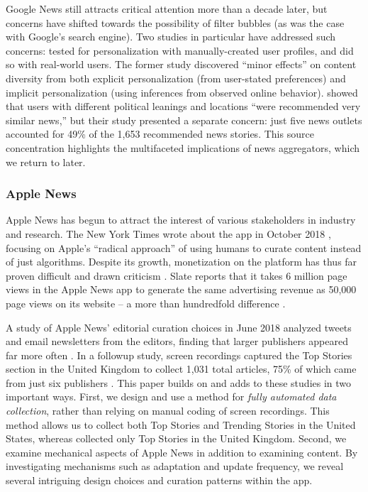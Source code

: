 Google News still attracts critical attention more than a decade later, but concerns have shifted towards the possibility of filter bubbles (as was the case with Google's search engine). Two studies in particular have addressed such concerns: \citet{Haim2018} tested for personalization with manually-created user profiles, and \citet{Nechushtai2019} did so with real-world users. The former study discovered ``minor effects'' on content diversity from both explicit personalization (from user-stated preferences) and implicit personalization (using inferences from observed online behavior). \citet{Nechushtai2019} showed that users with different political leanings and locations ``were recommended very similar news,'' but their study presented a separate concern: just five news outlets accounted for 49\% of the 1,653 recommended news stories. This source concentration highlights the multifaceted implications of news aggregators, which we return to later.


\subsubsection{Apple News}
Apple News has begun to attract the interest of various stakeholders in industry and research. The New York Times wrote about the app in October 2018 \citep{Nicas2018}, focusing on Apple's ``radical approach'' of using humans to curate content instead of just algorithms. Despite its growth, monetization on the platform has thus far proven difficult and drawn criticism \citep{Davies2017,Dotan2018}. Slate reports that it takes 6 million page views in the Apple News app to generate the same advertising revenue as 50,000 page views on its website -- a more than hundredfold difference \citep{Oremus2018}.

A study of Apple News' editorial curation choices in June 2018 analyzed tweets and email newsletters from the editors, finding that larger publishers appeared far more often \citep{Brown2018}. In a followup study, screen recordings captured the Top Stories section in the United Kingdom to collect 1,031 total articles, 75\% of which came from just six publishers \citep{Brown2018a}. This paper builds on and adds to these studies in two important ways. First, we design and use a method for \textit{fully automated data collection}, rather than relying on manual coding of screen recordings. This method allows us to collect both Top Stories and Trending Stories in the United States, whereas \citep{Brown2018a} collected only Top Stories in the United Kingdom. Second, we examine mechanical aspects of Apple News in addition to examining content. By investigating mechanisms such as adaptation and update frequency, we reveal several intriguing design choices and curation patterns within the app.
